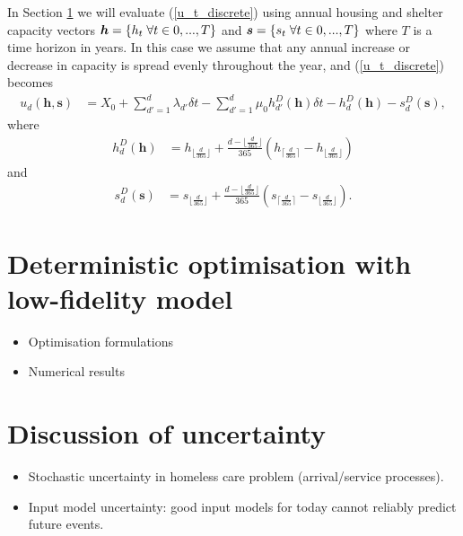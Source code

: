 \documentclass{article}
\begin{document}
In Section \ref{do} we will evaluate (\ref{u_t_discrete}) using annual housing and shelter capacity vectors $\boldsymbol{h} = \{h_t \hspace{0.1cm} \forall t \in 0,...,T\}$ and $\boldsymbol{s} = \{s_t \hspace{0.1cm} \forall t \in 0,...,T\}$ where $T$ is a time horizon in years. In this case we assume that any annual increase or decrease in capacity is spread evenly throughout the year, and (\ref{u_t_discrete}) becomes
%
\begin{align} \label{u_t_discrete_h_s_dependent}
u_d(\boldsymbol{h},\boldsymbol{s}) & = X_0 + \sum_{d'=1}^{d} \lambda_{d'} \delta t - \sum_{d'=1}^{d} \mu_0 h^D_{d'}(\boldsymbol{h}) \delta t - h^D_d(\boldsymbol{h}) - s^D_d(\boldsymbol{s}),
\end{align}
%
where 
%
\begin{align} \label{h_d}
h^D_d(\boldsymbol{h}) & = h_{\lfloor{\frac{d}{365}}\rfloor} + \frac{d-\lfloor\frac{d}{365}\rfloor}{365}(h_{\lceil{\frac{d}{365}}\rceil}-h_{\lfloor{\frac{d}{365}}\rfloor})
\end{align}
%
and
%
\begin{align} \label{s_d}
s^D_d(\boldsymbol{s}) & = s_{\lfloor{\frac{d}{365}}\rfloor} + \frac{d-\lfloor\frac{d}{365}\rfloor}{365}(s_{\lceil{\frac{d}{365}}\rceil}-s_{\lfloor{\frac{d}{365}}\rfloor}).
\end{align}
%
\section{Deterministic optimisation with low-fidelity model} \label{do}

\begin{itemize}[noitemsep]
\item Optimisation formulations
\item Numerical results
\end{itemize}

\section{Discussion of uncertainty} \label{uncert}

\begin{itemize}[noitemsep]
\item Stochastic uncertainty in homeless care problem (arrival/service processes).
\item Input model uncertainty: good input models for today cannot reliably predict future events.
\end{itemize}
\end{document}
